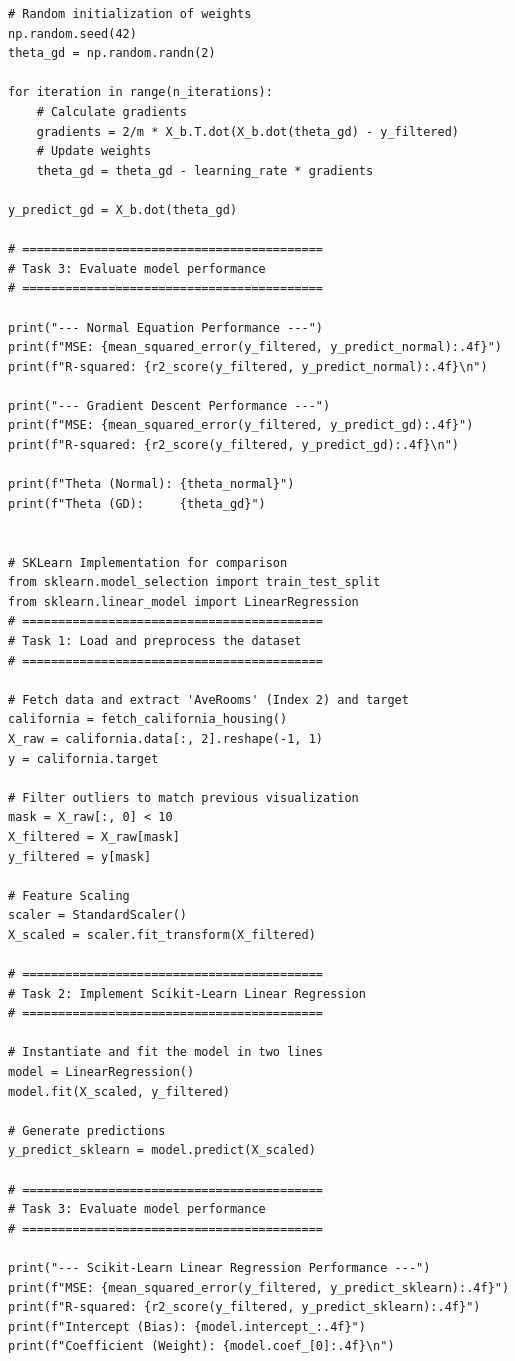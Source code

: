 \documentclass[11pt,a4paper]{article}
\begin{document}
\begin{lstlisting}
# Random initialization of weights
np.random.seed(42)
theta_gd = np.random.randn(2) 

for iteration in range(n_iterations):
    # Calculate gradients
    gradients = 2/m * X_b.T.dot(X_b.dot(theta_gd) - y_filtered)
    # Update weights
    theta_gd = theta_gd - learning_rate * gradients

y_predict_gd = X_b.dot(theta_gd)

# ==========================================
# Task 3: Evaluate model performance
# ==========================================

print("--- Normal Equation Performance ---")
print(f"MSE: {mean_squared_error(y_filtered, y_predict_normal):.4f}")
print(f"R-squared: {r2_score(y_filtered, y_predict_normal):.4f}\n")

print("--- Gradient Descent Performance ---")
print(f"MSE: {mean_squared_error(y_filtered, y_predict_gd):.4f}")
print(f"R-squared: {r2_score(y_filtered, y_predict_gd):.4f}\n")

print(f"Theta (Normal): {theta_normal}")
print(f"Theta (GD):     {theta_gd}")


# SKLearn Implementation for comparison
from sklearn.model_selection import train_test_split
from sklearn.linear_model import LinearRegression
# ==========================================
# Task 1: Load and preprocess the dataset
# ==========================================

# Fetch data and extract 'AveRooms' (Index 2) and target
california = fetch_california_housing()
X_raw = california.data[:, 2].reshape(-1, 1) 
y = california.target

# Filter outliers to match previous visualization
mask = X_raw[:, 0] < 10 
X_filtered = X_raw[mask]
y_filtered = y[mask]

# Feature Scaling
scaler = StandardScaler()
X_scaled = scaler.fit_transform(X_filtered)

# ==========================================
# Task 2: Implement Scikit-Learn Linear Regression
# ==========================================

# Instantiate and fit the model in two lines
model = LinearRegression()
model.fit(X_scaled, y_filtered)

# Generate predictions
y_predict_sklearn = model.predict(X_scaled)

# ==========================================
# Task 3: Evaluate model performance
# ==========================================

print("--- Scikit-Learn Linear Regression Performance ---")
print(f"MSE: {mean_squared_error(y_filtered, y_predict_sklearn):.4f}")
print(f"R-squared: {r2_score(y_filtered, y_predict_sklearn):.4f}")
print(f"Intercept (Bias): {model.intercept_:.4f}")
print(f"Coefficient (Weight): {model.coef_[0]:.4f}\n")


\end{lstlisting}
\end{document}
